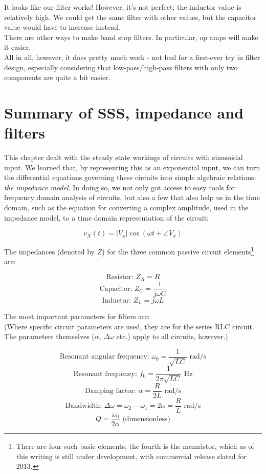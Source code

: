 \documentclass[12pt,a4paper]{report}
\begin{document}
It looks like our filter works! However, it's not perfect; the inductor value is relatively high. We could get the same filter with other values, but the capacitor value would have to increase instead.\\
There are other ways to make band stop filters. In particular, op amps will make it easier.\\
All in all, however, it does pretty much work - not bad for a first-ever try in filter design, especially  considering that low-pass/high-pass filters with only two components are quite a bit easier.

\newpage

\section{Summary of SSS, impedance and filters}
This chapter dealt with the steady state workings of circuits with sinusoidal input. We learned that, by representing this as an exponential input, we can turn the differential equations governing these circuits into simple algebraic relations: \emph{the impedance model}. In doing so, we not only got access to easy tools for frequency domain analysis of circuits, but also a few that also help us in the time domain, such as the equation for converting a complex amplitude, used in the impedance model, to a time domain representation of the circuit:

\[ v_X(t) = |V_x| \cos{(\omega t + \angle V_x)} \]

The impedances (denoted by $Z$) for the three common passive circuit elements\footnote{There are four such basic elements; the fourth is the memristor, which as of this writing is still under development, with commercial release slated for 2013.} are:

\[ \text{Resistor: } Z_R = R \]
\[ \text{Capacitor: } Z_C = \frac{1}{j\omega C} \]
\[ \text{Inductor: } Z_L = j\omega L \]

The most important parameters for filters are:\\
(Where specific circuit parameters are used, they are for the series RLC circuit. The parameters themselves ($\alpha$, $\Delta \omega$ etc.) apply to all circuits, however.)

\[ \text{Resonant angular frequency: } \omega_0 = \frac{1}{\sqrt{LC}} \text{ rad/s} \]
\[ \text{Resonant frequency: } f_0 = \frac{1}{2\pi \sqrt{LC}} \text { Hz} \]
\[ \text{Damping factor: } \alpha = \frac{R}{2 L} \text{ rad/s} \]
\[ \text{Bandwidth: } \Delta \omega = \omega_2 - \omega_1 = 2 \alpha = \frac{R}{L} \text { rad/s} \]
\[ Q = \frac{\omega_0}{2 \alpha} \text{ (dimensionless)} \]
\end{document}
